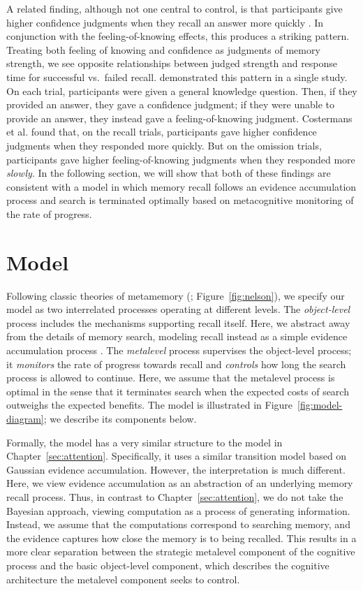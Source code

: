 A related finding, although not one central to control, is that participants give higher confidence judgments when they recall an answer more quickly \citepnelson{}. In conjunction with the feeling-of-knowing effects, this produces a striking pattern. Treating both feeling of knowing and confidence as judgments of memory strength, we see opposite relationships between judged strength and response time for successful vs.~failed recall. \citet{costermans1992confidence} demonstrated this pattern in a single study. On each trial, participants were given a general knowledge question. Then, if they provided an answer, they gave a confidence judgment; if they were unable to provide an answer, they instead gave a feeling-of-knowing judgment. Costermans et al. found that, on the recall trials, participants gave higher confidence judgments when they responded more quickly. But on the omission trials, participants gave higher feeling-of-knowing judgments when they responded more \emph{slowly}. In the following section, we will show that both of these findings are consistent with a model in which memory recall follows an evidence accumulation process and search is terminated optimally based on metacognitive monitoring of the rate of progress.

\section{Model}

Following classic theories of metamemory (\citealpnelson{}; Figure~\ref{fig:nelson}), we specify our model as two interrelated processes operating at different levels. The \emph{object-level} process includes the mechanisms supporting recall itself. Here, we abstract away from the details of memory search, modeling recall instead as a simple evidence accumulation process \citep{ratcliff2002estimating,sederberg2008context}. The \emph{metalevel} process supervises the object-level process; it \emph{monitors} the rate of progress towards recall and \emph{controls} how long the search process is allowed to continue. Here, we assume that the metalevel process is optimal in the sense that it terminates search when the expected costs of search outweighs the expected benefits. The model is illustrated in Figure~\ref{fig:model-diagram}; we describe its components below.

Formally, the model has a very similar structure to the model in Chapter~\ref{sec:attention}. Specifically, it uses a similar transition model based on Gaussian evidence accumulation. However, the interpretation is much different. Here, we view evidence accumulation as an abstraction of an underlying memory recall process. Thus, in contrast to Chapter~\ref{sec:attention}, we do not take the Bayesian approach, viewing computation as a process of generating information. Instead, we assume that the computations correspond to searching memory, and the evidence captures how close the memory is to being recalled. This results in a more clear separation between the strategic metalevel component of the cognitive process and the basic object-level component, which describes the cognitive architecture the metalevel component seeks to control.

